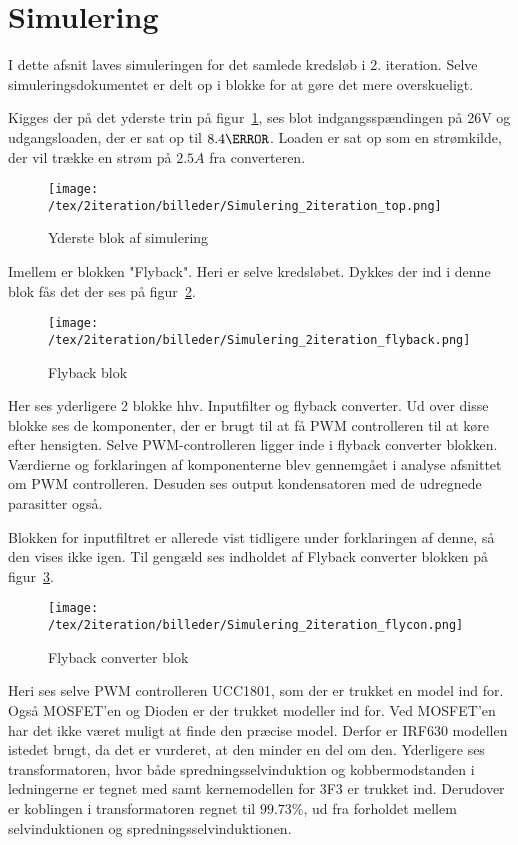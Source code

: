 \section{Simulering}

I dette afsnit laves simuleringen for det samlede kredsløb i 2. iteration. 
Selve simuleringsdokumentet er delt op i blokke for at gøre det mere overskueligt. 


\noindent Kigges der på det yderste trin på figur~\ref{fig: simtop}, ses blot indgangsspændingen på 26V og udgangsloaden, der er sat op til $8.4\ohm$. Loaden er sat op som en strømkilde, der vil trække en strøm på $2.5A$ fra converteren.
\begin{figure}[H]
	\center
	\texttt{[image: /tex/2iteration/billeder/Simulering\_2iteration\_top.png]}
	\caption{Yderste blok af simulering}
	\label{fig: simtop}
\end{figure}
Imellem er blokken "Flyback". Heri er selve kredsløbet. Dykkes der ind i denne blok fås det der ses på figur~\ref{fig: simfly}. 
\begin{figure}[H]
	\center
	\texttt{[image: /tex/2iteration/billeder/Simulering\_2iteration\_flyback.png]}
	\caption{Flyback blok}
	\label{fig: simfly}
\end{figure}
Her ses yderligere 2 blokke hhv. Inputfilter og flyback converter. Ud over disse blokke ses de komponenter, der er brugt til at få PWM controlleren til at køre efter hensigten. Selve PWM-controlleren ligger inde i flyback converter blokken. Værdierne og forklaringen af komponenterne blev gennemgået i analyse afsnittet om PWM controlleren.
Desuden ses output kondensatoren med de udregnede parasitter også.


\noindent Blokken for inputfiltret er allerede vist tidligere under forklaringen af denne, så den vises ikke igen. Til gengæld ses indholdet af Flyback converter blokken på figur~\ref{fig: simflycon}. 
\begin{figure}[H]
	\center
	\texttt{[image: /tex/2iteration/billeder/Simulering\_2iteration\_flycon.png]}
	\caption{Flyback converter blok}
	\label{fig: simflycon}
\end{figure}
Heri ses selve PWM controlleren UCC1801, som der er trukket en model ind for\cite{ucc1801-pspice}. Også MOSFET'en og Dioden er der trukket modeller ind for. Ved MOSFET'en har det ikke været muligt at finde den præcise model. Derfor er IRF630 modellen istedet brugt, da det er vurderet, at den minder en del om den\cite{IRF630}. 
Yderligere ses transformatoren, hvor både spredningsselvinduktion og kobbermodstanden i ledningerne er tegnet med samt kernemodellen for 3F3 er trukket ind. Derudover er koblingen i transformatoren regnet til $99.73\percent$, ud fra forholdet mellem selvinduktionen og spredningsselvinduktionen.

